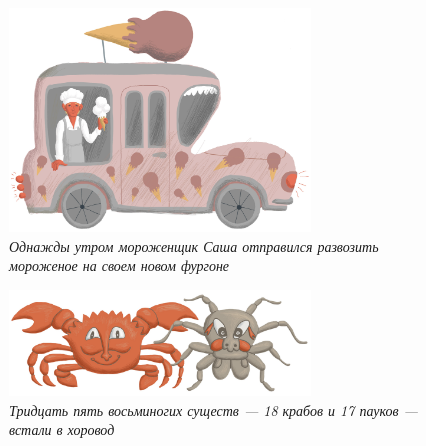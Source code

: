 \documentclass[10pt]{scrbook} \usepackage{modules/nonstahp_book}
\begin{document}
\begin{figure} \begin{center}
	\includegraphics[width=8cm]{figures/color/10c.jpg}
	\vspace{0.5cm}
	\caption{
             {\itshape  Однажды утром мороженщик Саша отправился развозить мороженое 
             на своем новом фургоне }\medskip\\
             }
\end{center} \end{figure}

\begin{figure} \begin{center}
	\includegraphics[width=8cm]{figures/color/18c.jpg}
	\vspace{0.5cm}
	\caption{
             {\itshape  Тридцать пять восьминогих существ — 18 крабов и 17 
            пауков — встали в хоровод }\medskip\\
             }
\end{center} \end{figure}
\end{document}
